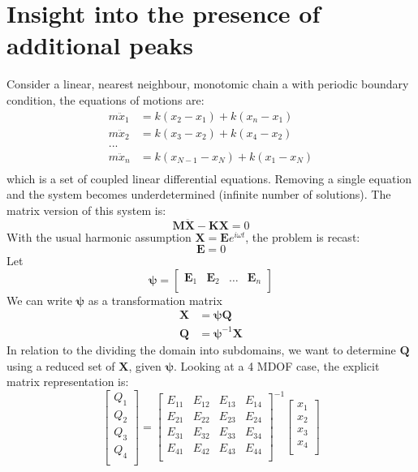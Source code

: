 \chapter{Insight into the presence of additional peaks}
Consider a linear, nearest neighbour, monotomic chain a with periodic boundary condition, the equations of motions are:
\begin{equation}
\begin{split}
m\ddot{x}_1&=k(x_2-x_1)+k(x_n-x_1)\\
m\ddot{x}_2&=k(x_3-x_2)+k(x_4-x_2)\\
...\\
m\ddot{x}_n&=k(x_{N-1}-x_N)+k(x_1-x_N)\\
\end{split}
\end{equation}
which is a set of coupled linear differential equations. Removing a single equation and the system becomes underdetermined (infinite number of solutions). The matrix version of this system is:
\begin{equation}
\bm{M}\bm{\ddot{X}}-\bm{K}\bm{X}=0
\end{equation}
With the usual harmonic assumption $\bm{X}=\bm{E}e^{i\omega t}$, the problem is recast:
\begin{equation}
[\omega^2\bm{M}^{-1}\bm{M}-\bm{M}^{-1}\bm{K}]\bm{E}=0
\end{equation}
Let
\[
\bm{\psi}=
\begin{bmatrix}
   \bm{E}_1 & \bm{E}_2 & \dots &\bm{E}_n \\
 \end{bmatrix}
\]
We can write $\bm{\psi}$ as a transformation matrix
\begin{equation}
\begin{split}
\bm{X}&=\bm{\psi}\bm{Q}\\
\bm{Q}&=\bm{\psi}^{-1}\bm{X}
\end{split}
\end{equation}
In relation to the dividing the domain into subdomains, we want to determine $\bm{Q}$ using a reduced set of $\bm{X}$, given $\bm{\psi}$. Looking at a 4 MDOF case, the explicit matrix representation is:
\[
\begin{bmatrix}
   Q_1\\
   Q_2\\
   Q_3\\
   Q_4\\
\end{bmatrix}=
\begin{bmatrix}
   E_{11} & E_{12} & E_{13} & E_{14} \\
   E_{21} & E_{22} & E_{23} & E_{24} \\
   E_{31} & E_{32} & E_{33} & E_{34} \\
   E_{41} & E_{42} & E_{43} & E_{44} \\
\end{bmatrix}^{-1}
\begin{bmatrix}
   x_1\\
   x_2\\
   x_3\\
   x_4\\
\end{bmatrix}
\]
